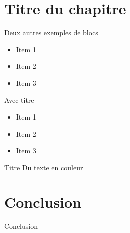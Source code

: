 \documentclass[slideopt,A4,showboxes,svgnames]{beamer}
\begin{document}
\section{Titre du chapitre}
 \frame{\sectionpage}

\begin{frame}{Deux autres exemples de blocs}
    \begin{exampleblock}{}
 \begin{itemize}
    \item{Item 1 }
    \item {Item 2}
    \item {Item 3}
    \end{itemize}
  \end{exampleblock}
      \begin{exampleblock}{Avec titre}
 \begin{itemize}
    \item{Item 1 }
    \item {Item 2}
    \item {Item 3}
    \end{itemize}
  \end{exampleblock}
\end{frame}
\begin{frame}{Titre}
Du \textcolor{gris_fonce_inria}{texte}  {en}  \textcolor{rouge_inria}{couleur} 
\end{frame}
\section{Conclusion}
\begin{frame}{Conclusion}
 
\end{frame}
\end{document}
